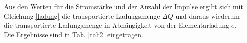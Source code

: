 \noindent Aus den Werten für die Stromstärke und der Anzahl der Impulse ergibt sich mit Gleichung \eqref{ladung} die transportierte Ladungsmenge $\Delta Q$ und daraus wiederum die transportierte Ladungsmenge in Abhängigkeit von der Elementarladung $e$. Die Ergebnisse sind in Tab. \ref{tab2} eingetragen. 




